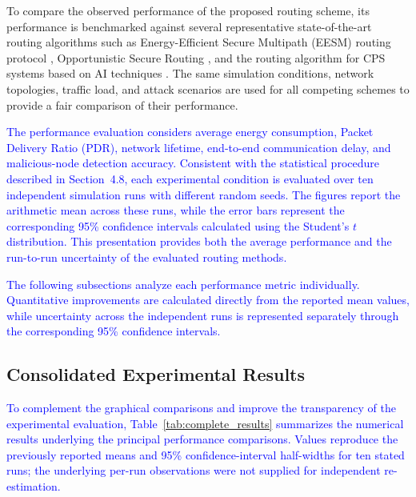 \documentclass[pdflatex,sn-mathphys-num]{sn-jnl}
\begin{document}
To compare the observed performance of the proposed routing scheme, its
performance is benchmarked against several representative state-of-the-art
routing algorithms such as Energy-Efficient Secure Multipath (EESM) routing
protocol \cite{biswas2023eesm}, Opportunistic Secure Routing
\cite{narayana2026secure}, and the routing algorithm for CPS systems based on
AI techniques \cite{wong2025sustainable}. The same simulation conditions,
network topologies, traffic load, and attack scenarios are used for all
competing schemes to provide a fair comparison of their performance.

\textcolor{blue}{The performance evaluation considers average energy
consumption, Packet Delivery Ratio (PDR), network lifetime, end-to-end
communication delay, and malicious-node detection accuracy. Consistent with
the statistical procedure described in Section~4.8, each experimental
condition is evaluated over ten independent simulation runs with different
random seeds. The figures report the arithmetic mean across these runs,
while the error bars represent the corresponding 95\% confidence intervals
calculated using the Student's $t$ distribution. This presentation provides
both the average performance and the run-to-run uncertainty of the evaluated
routing methods.}

\textcolor{blue}{The following subsections analyze each performance metric
individually. Quantitative improvements are calculated directly from the
reported mean values, while uncertainty across the independent runs is
represented separately through the corresponding 95\% confidence intervals.}

\subsection{Consolidated Experimental Results}

\textcolor{blue}{To complement the graphical comparisons and improve
the transparency of the experimental evaluation, Table~\ref{tab:complete_results}
summarizes the numerical results underlying the principal performance
comparisons. Values reproduce the previously reported means and 95\% confidence-interval half-widths for ten stated runs; the underlying per-run observations were not supplied for independent re-estimation.}
\end{document}
